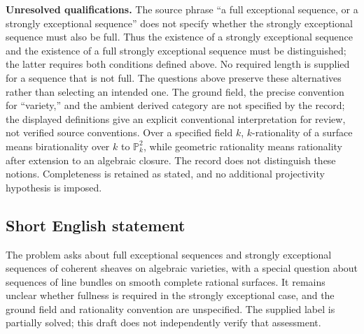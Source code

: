 \documentclass[11pt]{article}
\newcommand{\PP}{\mathbb{P}}
\begin{document}
\textbf{Unresolved qualifications.} The source phrase ``a full exceptional sequence, or a strongly exceptional sequence'' does not specify whether the strongly exceptional sequence must also be full. Thus the existence of a strongly exceptional sequence and the existence of a full strongly exceptional sequence must be distinguished; the latter requires both conditions defined above. No required length is supplied for a sequence that is not full. The questions above preserve these alternatives rather than selecting an intended one. The ground field, the precise convention for ``variety,'' and the ambient derived category are not specified by the record; the displayed definitions give an explicit conventional interpretation for review, not verified source conventions. Over a specified field \(k\), \(k\)-rationality of a surface means birationality over \(k\) to \(\PP^2_k\), while geometric rationality means rationality after extension to an algebraic closure. The record does not distinguish these notions. Completeness is retained as stated, and no additional projectivity hypothesis is imposed.
\subsection{Short English statement}
The problem asks about full exceptional sequences and strongly exceptional sequences of coherent sheaves on algebraic varieties, with a special question about sequences of line bundles on smooth complete rational surfaces. It remains unclear whether fullness is required in the strongly exceptional case, and the ground field and rationality convention are unspecified. The supplied label is partially solved; this draft does not independently verify that assessment.
\end{document}
